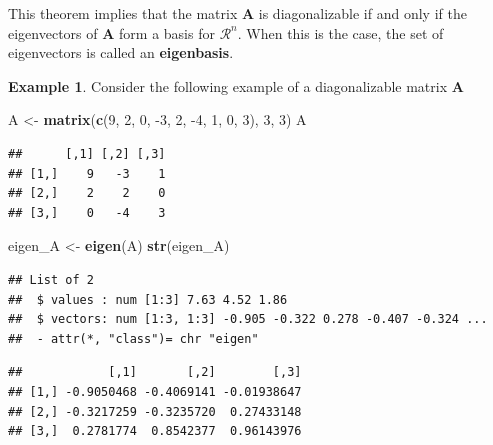 \documentclass[
]{book}
\newenvironment{Shaded}{\begin{snugshade}}{\end{snugshade}}
\newcommand{\DecValTok}[1]{\textcolor[rgb]{0.00,0.00,0.81}{#1}}
\newcommand{\KeywordTok}[1]{\textcolor[rgb]{0.13,0.29,0.53}{\textbf{#1}}}
\newcommand{\NormalTok}[1]{#1}
\newcommand{\OperatorTok}[1]{\textcolor[rgb]{0.81,0.36,0.00}{\textbf{#1}}}
\newcommand{\StringTok}[1]{\textcolor[rgb]{0.31,0.60,0.02}{#1}}
\theoremstyle{definition}
\theoremstyle{definition}
\newtheorem{example}{Example}[chapter]
\theoremstyle{definition}
\theoremstyle{definition}
\theoremstyle{remark}
\begin{document}
This theorem implies that the matrix \(\mathbf{A}\) is diagonalizable if and only if the eigenvectors of \(\mathbf{A}\) form a basis for \(\mathcal{R}^n\). When this is the case, the set of eigenvectors is called an \textbf{eigenbasis}.

\begin{example}

Consider the following example of a diagonalizable matrix \(\mathbf{A}\)

\begin{Shaded}
\begin{Highlighting}[]
\NormalTok{A <-}\StringTok{ }\KeywordTok{matrix}\NormalTok{(}\KeywordTok{c}\NormalTok{(}\DecValTok{9}\NormalTok{, }\DecValTok{2}\NormalTok{, }\DecValTok{0}\NormalTok{, }\DecValTok{-3}\NormalTok{, }\DecValTok{2}\NormalTok{, }\DecValTok{-4}\NormalTok{, }\DecValTok{1}\NormalTok{, }\DecValTok{0}\NormalTok{, }\DecValTok{3}\NormalTok{), }\DecValTok{3}\NormalTok{, }\DecValTok{3}\NormalTok{)}
\NormalTok{A}
\end{Highlighting}
\end{Shaded}

\begin{verbatim}
##      [,1] [,2] [,3]
## [1,]    9   -3    1
## [2,]    2    2    0
## [3,]    0   -4    3
\end{verbatim}

\begin{Shaded}
\begin{Highlighting}[]
\NormalTok{eigen_A <-}\StringTok{ }\KeywordTok{eigen}\NormalTok{(A)}
\KeywordTok{str}\NormalTok{(eigen_A)}
\end{Highlighting}
\end{Shaded}

\begin{verbatim}
## List of 2
##  $ values : num [1:3] 7.63 4.52 1.86
##  $ vectors: num [1:3, 1:3] -0.905 -0.322 0.278 -0.407 -0.324 ...
##  - attr(*, "class")= chr "eigen"
\end{verbatim}

\begin{Shaded}
\end{Shaded}

\begin{verbatim}
##            [,1]       [,2]        [,3]
## [1,] -0.9050468 -0.4069141 -0.01938647
## [2,] -0.3217259 -0.3235720  0.27433148
## [3,]  0.2781774  0.8542377  0.96143976
\end{verbatim}


\end{example}
\end{document}
